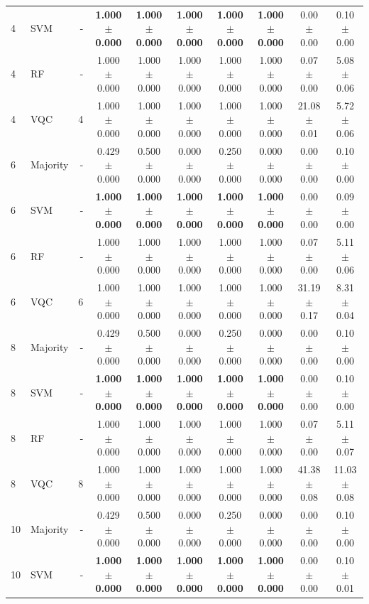 \begin{tabular}{llrccccccc}
4 & SVM & - & \textbf{1.000 $\pm$ 0.000} & \textbf{1.000 $\pm$ 0.000} & \textbf{1.000 $\pm$ 0.000} & \textbf{1.000 $\pm$ 0.000} & \textbf{1.000 $\pm$ 0.000} & 0.00 $\pm$ 0.00 & 0.10 $\pm$ 0.00 \\
4 & RF & - & 1.000 $\pm$ 0.000 & 1.000 $\pm$ 0.000 & 1.000 $\pm$ 0.000 & 1.000 $\pm$ 0.000 & 1.000 $\pm$ 0.000 & 0.07 $\pm$ 0.00 & 5.08 $\pm$ 0.06 \\
4 & VQC & 4 & 1.000 $\pm$ 0.000 & 1.000 $\pm$ 0.000 & 1.000 $\pm$ 0.000 & 1.000 $\pm$ 0.000 & 1.000 $\pm$ 0.000 & 21.08 $\pm$ 0.01 & 5.72 $\pm$ 0.06 \\
\midrule
6 & Majority & - & 0.429 $\pm$ 0.000 & 0.500 $\pm$ 0.000 & 0.000 $\pm$ 0.000 & 0.250 $\pm$ 0.000 & 0.000 $\pm$ 0.000 & 0.00 $\pm$ 0.00 & 0.10 $\pm$ 0.00 \\
6 & SVM & - & \textbf{1.000 $\pm$ 0.000} & \textbf{1.000 $\pm$ 0.000} & \textbf{1.000 $\pm$ 0.000} & \textbf{1.000 $\pm$ 0.000} & \textbf{1.000 $\pm$ 0.000} & 0.00 $\pm$ 0.00 & 0.09 $\pm$ 0.00 \\
6 & RF & - & 1.000 $\pm$ 0.000 & 1.000 $\pm$ 0.000 & 1.000 $\pm$ 0.000 & 1.000 $\pm$ 0.000 & 1.000 $\pm$ 0.000 & 0.07 $\pm$ 0.00 & 5.11 $\pm$ 0.06 \\
6 & VQC & 6 & 1.000 $\pm$ 0.000 & 1.000 $\pm$ 0.000 & 1.000 $\pm$ 0.000 & 1.000 $\pm$ 0.000 & 1.000 $\pm$ 0.000 & 31.19 $\pm$ 0.17 & 8.31 $\pm$ 0.04 \\
\midrule
8 & Majority & - & 0.429 $\pm$ 0.000 & 0.500 $\pm$ 0.000 & 0.000 $\pm$ 0.000 & 0.250 $\pm$ 0.000 & 0.000 $\pm$ 0.000 & 0.00 $\pm$ 0.00 & 0.10 $\pm$ 0.00 \\
8 & SVM & - & \textbf{1.000 $\pm$ 0.000} & \textbf{1.000 $\pm$ 0.000} & \textbf{1.000 $\pm$ 0.000} & \textbf{1.000 $\pm$ 0.000} & \textbf{1.000 $\pm$ 0.000} & 0.00 $\pm$ 0.00 & 0.10 $\pm$ 0.00 \\
8 & RF & - & 1.000 $\pm$ 0.000 & 1.000 $\pm$ 0.000 & 1.000 $\pm$ 0.000 & 1.000 $\pm$ 0.000 & 1.000 $\pm$ 0.000 & 0.07 $\pm$ 0.00 & 5.11 $\pm$ 0.07 \\
8 & VQC & 8 & 1.000 $\pm$ 0.000 & 1.000 $\pm$ 0.000 & 1.000 $\pm$ 0.000 & 1.000 $\pm$ 0.000 & 1.000 $\pm$ 0.000 & 41.38 $\pm$ 0.08 & 11.03 $\pm$ 0.08 \\
\midrule
10 & Majority & - & 0.429 $\pm$ 0.000 & 0.500 $\pm$ 0.000 & 0.000 $\pm$ 0.000 & 0.250 $\pm$ 0.000 & 0.000 $\pm$ 0.000 & 0.00 $\pm$ 0.00 & 0.10 $\pm$ 0.00 \\
10 & SVM & - & \textbf{1.000 $\pm$ 0.000} & \textbf{1.000 $\pm$ 0.000} & \textbf{1.000 $\pm$ 0.000} & \textbf{1.000 $\pm$ 0.000} & \textbf{1.000 $\pm$ 0.000} & 0.00 $\pm$ 0.00 & 0.10 $\pm$ 0.01 \\

\end{tabular}
